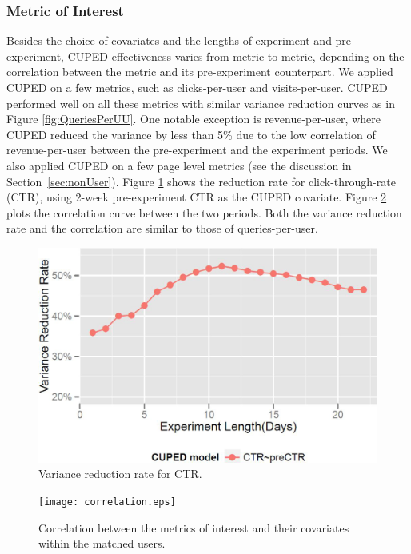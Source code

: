 \documentclass{sig-alternate}
\begin{document}
\subsubsection{Metric of Interest}
Besides the choice of covariates and the lengths of experiment and pre-experiment, CUPED effectiveness varies from metric to metric, depending on the correlation between the metric and its pre-experiment counterpart. We applied \linebreak CUPED on a few metrics, such as clicks-per-user and visits-per-user. CUPED performed well on all these metrics with similar variance reduction curves as in Figure \ref{fig:QueriesPerUU}. One notable exception is revenue-per-user, where CUPED reduced the variance by less than 5\% due to the low correlation of revenue-per-user between the pre-experiment and the experiment periods. We also applied CUPED on a few page level metrics (see the discussion in Section~\ref{sec:nonUser}). Figure \ref{fig:pcr} shows the reduction rate for click-through-rate (CTR), using 2-week pre-experiment CTR as the CUPED covariate. Figure \ref{fig:correlation} plots the correlation curve between the two periods. Both the variance reduction rate and the correlation are similar to those of queries-per-user. 
\begin{figure}[!hbtp]
  \centering
  \includegraphics[width=.5\textwidth]{pcr.eps}
  \caption{Variance reduction rate for CTR.}
  \label{fig:pcr}
\end{figure}
\begin{figure}[!hbtp]
  \centering
  \texttt{[image: correlation.eps]}
  \caption{Correlation between the metrics of interest and their covariates within the matched users.}
  \label{fig:correlation}
\end{figure}
\end{document}
